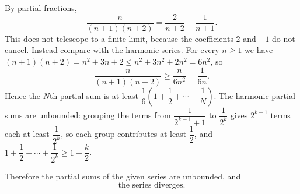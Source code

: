 By partial fractions,
\[
\dfrac{n}{(n+1)(n+2)}=\dfrac{2}{n+2}-\dfrac{1}{n+1}.
\]
This does not telescope to a finite limit, because the coefficients $2$ and $-1$ do not cancel. Instead compare with the harmonic series. For every $n\ge 1$ we have $(n+1)(n+2)=n^2+3n+2\le n^2+3n^2+2n^2=6n^2$, so
\[
\dfrac{n}{(n+1)(n+2)}\ge \dfrac{n}{6n^2}=\dfrac{1}{6n}.
\]
Hence the $N$th partial sum is at least $\dfrac{1}{6}\left(1+\dfrac{1}{2}+\cdots+\dfrac{1}{N}\right)$. The harmonic partial sums are unbounded: grouping the terms from $\dfrac{1}{2^{k-1}+1}$ to $\dfrac{1}{2^k}$ gives $2^{k-1}$ terms each at least $\dfrac{1}{2^k}$, so each group contributes at least $\dfrac{1}{2}$, and $1+\dfrac{1}{2}+\cdots+\dfrac{1}{2^k}\ge 1+\dfrac {k}{2}$.

Therefore the partial sums of the given series are unbounded, and
\[
\boxed{\text{the series diverges.}}
\]
